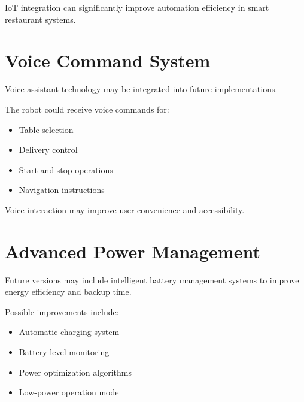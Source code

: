 \documentclass[12pt,a4paper,oneside]{report}
\begin{document}
IoT integration can significantly improve automation efficiency in smart restaurant systems.


\section{Voice Command System}

Voice assistant technology may be integrated into future implementations.

The robot could receive voice commands for:

\begin{itemize}

\item Table selection

\item Delivery control

\item Start and stop operations

\item Navigation instructions

\end{itemize}

Voice interaction may improve user convenience and accessibility.


\section{Advanced Power Management}

Future versions may include intelligent battery management systems to improve energy efficiency and backup time.

Possible improvements include:

\begin{itemize}

\item Automatic charging system

\item Battery level monitoring

\item Power optimization algorithms

\item Low-power operation mode

\end{itemize}
\end{document}
